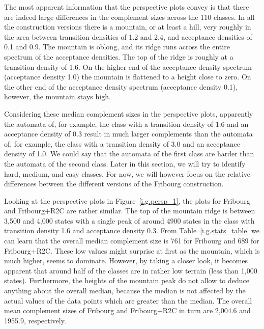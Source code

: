 The most apparent information that the perspective plots convey is that there are indeed large differences in the complement sizes across the 110 classes. In all the construction versions there is a mountain, or at least a hill, very roughly in the area between transition densities of 1.2 and 2.4, and acceptance densities of 0.1 and 0.9. The mountain is oblong, and its ridge runs across the entire spectrum of the acceptance densities. The top of the ridge is roughly at a transition density of 1.6. On the higher end of the acceptance density spectrum (acceptance density 1.0) the mountain is flattened to a height close to zero. On the other end of the acceptance density spectrum (acceptance density 0.1), however, the mountain stays high.

Considering these median complement sizes in the perspective plots, apparently the automata of, for example, the class with a transition density of 1.6 and an acceptance density of 0.3 result in much larger complements than the automata of, for example, the class with a transition density of 3.0 and an acceptance density of 1.0. We could say that the automata of the first class are harder than the automata of the second class. Later in this section, we will try to identify hard, medium, and easy classes. For now, we will however focus on the relative differences between the different versions of the Fribourg construction.

Looking at the perspective plots in Figure~\ref{i.g.persp_1}, the plots for Fribourg and Fribourg+R2C are rather similar. The top of the mountain ridge is between 3,500 and 4,000 states with a single peak of around 4900 states in the class with transition density 1.6 and acceptance density 0.3. From Table~\ref{i.g.stats_table} we can learn that the overall median complement size is 761 for Fribourg and 689 for Fribourg+R2C. These low values might surprise at first as the mountain, which is much higher, seems to dominate. However, by taking a closer look, it becomes apparent that around half of the classes are in rather low terrain (less than 1,000 states). Furthermore, the heights of the mountain peak do not allow to deduce anything about the overall median, because the median is not affected by the actual values of the data points which are greater than the median. The overall mean complement sizes of Fribourg and Fribourg+R2C in turn are 2,004.6 and 1955.9, respectively. 


